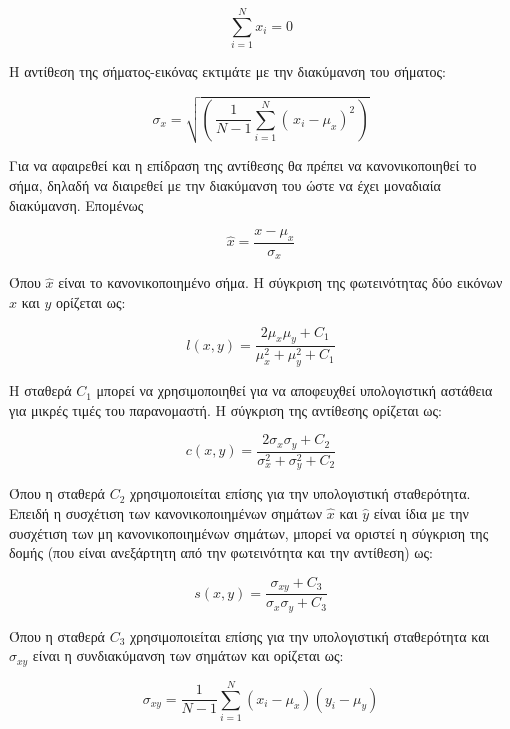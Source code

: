 \documentclass[a4paper,12pt]{article}
\begin{document}
\begin{equation*}
    \sum_{i=1}^{N} x_i = 0
\end{equation*}

Η αντίθεση της σήματος-εικόνας εκτιμάτε με την διακύμανση του σήματος:

\begin{equation*}
    \sigma_x = \sqrt{\left(\, \frac{1}{N-1} \sum_{i=1}^{N} {\left(\,x_i -
                     \mu_x\right)}^2\, \right)}
\end{equation*}

Για να αφαιρεθεί και η επίδραση της αντίθεσης θα πρέπει να κανονικοποιηθεί το
σήμα, δηλαδή να διαιρεθεί με την διακύμανση του ώστε να έχει μοναδιαία
διακύμανση. Επομένως

\begin{equation*}
    \hat{x} = \frac{x-\mu_x} {\sigma_x}
\end{equation*}

Όπου $\hat{x}$ είναι το κανονικοποιημένο σήμα. Η σύγκριση της φωτεινότητας δύο
εικόνων $x$ και $y$ ορίζεται ως:

\begin{equation}\label{luminance_comp}
    l(x,y) = \frac {2\mu_x\mu_y + C_1} {\mu_x^2 + \mu_y^2 + C_1}
\end{equation}

Η σταθερά $C_1$ μπορεί να χρησιμοποιηθεί για να αποφευχθεί υπολογιστική αστάθεια
για μικρές τιμές του παρανομαστή. Η σύγκριση της αντίθεσης ορίζεται ως:

\begin{equation}\label{contrast_comp}
    c(x,y) = \frac {2\sigma_x\sigma_y + C_2} {\sigma_x^2 + \sigma_y^2 + C_2}
\end{equation}

Όπου η σταθερά $C_2$ χρησιμοποιείται επίσης για την υπολογιστική σταθερότητα.
Επειδή η συσχέτιση των κανονικοποιημένων σημάτων $\hat{x}$ και $\hat{y}$ είναι
ίδια με την συσχέτιση των μη κανονικοποιημένων σημάτων, μπορεί να οριστεί η
σύγκριση της δομής (που είναι ανεξάρτητη από την φωτεινότητα και την αντίθεση)
ως:

\begin{equation}\label{structure_comp}
    s(x,y) = \frac {\sigma_{xy} + C_3} {\sigma_x \sigma_y + C_3}
\end{equation}

Όπου η σταθερά $C_3$ χρησιμοποιείται επίσης για την υπολογιστική σταθερότητα και
$\sigma_{xy}$ είναι η συνδιακύμανση των σημάτων και ορίζεται ως:

\begin{equation*}
    \sigma_{xy} = \frac {1} {N-1} \sum_{i=1}^{N} {(x_i - \mu_x) (y_i - \mu_y)}
\end{equation*}
\end{document}
